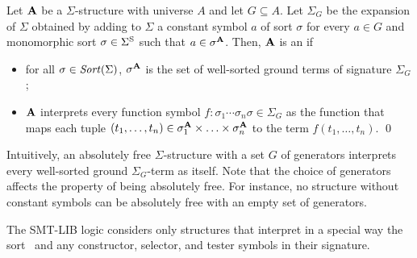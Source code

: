 \begin{definition}
Let $\mathbf{A}$ be a $\Sigma$-structure with universe $A$ and 
let $G \subseteq A$.
Let $\Sigma_G$ be the expansion of $\Sigma$ obtained by adding to $\Sigma$
a constant symbol $a$ of sort $\sigma$
for every $a \in G$ and monomorphic sort $\sigma \in \Sigma^\mathrm{S}$ 
such that $a \in \sigma^{\mathbf{A}}$.
Then, $\mathbf{A}$ is an 
if 
\begin{itemize}
\item
for all $\sigma \in \mathit{Sort}(\Sigma)$, $\sigma^{\mathbf{A}}$ is the set 
of well-sorted ground terms of signature $\Sigma_G$;

\item
$\mathbf{A}$ interprets every function symbol 
$f{:}\sigma_1 \cdots \sigma_n \sigma \in \Sigma_G$ as the function that maps each tuple 
$(t_1,\ldots,t_n) \in \sigma_1^{\mathbf{A}} \times \ldots \times \sigma_n^{\mathbf{A}}$ 
to the term $f(t_1,\ldots,t_n)$.
\qed
\end{itemize}
\end{definition}


Intuitively, an absolutely free $\Sigma$-structure with a set $G$ of generators
interprets every well-sorted ground $\Sigma_G$-term as itself.
Note that the choice of generators affects the property of being absolutely free.
For instance, no structure without constant symbols can be absolutely free 
with an empty set of generators.
\medskip

The SMT-LIB logic considers only structures that interpret in a special way 
the sort \bool\ and any constructor, selector, and tester symbols in their signature.

